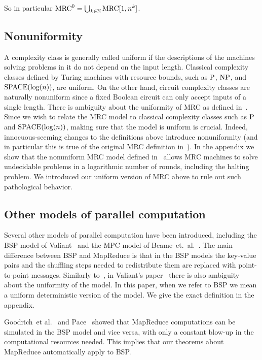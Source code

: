 \documentclass[11pt]{article}
\theoremstyle{definition}
\theoremstyle{remark}
\newcommand{\N}{\mathbb{N}}
\newcommand{\mrc}{\textup{MRC}}
\renewcommand{\P}{\textup{P}}
\renewcommand{\L}{\textup{SPACE}(\log(n))}
\newcommand{\NP}{\textup{NP}}
\begin{document}
So in particular $\mrc^0=\bigcup_{k\in\N}\text{MRC}[1,n^k]$. 


\subsection{Nonuniformity}  \label{subsec:nonuniformity}

A complexity class is generally called uniform if the descriptions of the
machines solving problems in it do not depend on the input length. Classical
complexity classes defined by Turing machines with resource bounds, such as
$\P$, $\NP$, and $\L$, are uniform. On the other hand, circuit complexity
classes are naturally nonuniform since a fixed Boolean circuit can only accept
inputs of a single length. There is ambiguity about the uniformity of MRC as
defined in~\cite{Karloff10}. Since we wish to relate the MRC model to classical
complexity classes such as $\P$ and $\L$, making sure that the model is uniform
is crucial. Indeed, innocuous-seeming changes to the definitions above
introduce nonuniformity (and in particular this is true of the original MRC
definition in~\cite{Karloff10}). In the appendix we show that the nonuniform
MRC model defined in~\cite{Karloff10} allows MRC machines to solve undecidable
problems in a logarithmic number of rounds, including the halting problem. We
introduced our uniform version of MRC above to rule out such pathological
behavior.

\subsection{Other models of parallel computation} \label{subsec:bspmodel}

Several other models of parallel computation have been introduced, including the BSP model of Valiant~\cite{Valiant90} and the MPC model of Beame~et.~al.~\cite{BeameKS13}.  The main difference
between BSP and MapReduce is that in the BSP models the key-value pairs and the
shuffling steps needed to redistribute them are replaced with point-to-point
messages.  Similarly to~\cite{Karloff10}, in Valiant's paper~\cite{Valiant90}
there is also ambiguity about the uniformity of the model. In this paper, when
we refer to BSP we mean a uniform deterministic version of the model. We give
the exact definition in the appendix.

Goodrich~et al.~\cite{GoodrichSZ11} and Pace~\cite{Pace12} showed that
MapReduce computations can be simulated in the BSP model and vice versa, with
only a constant blow-up in the computational resources needed.  This implies
that our theorems about MapReduce automatically apply to BSP.
\end{document}
